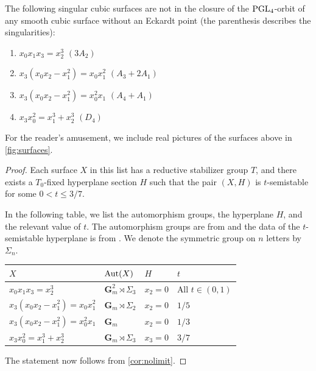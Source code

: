 \documentclass[12pt,reqno]{amsart}
\numberwithin{equation}{section}
\newcommand{\G}{\mathbf G}
\begin{document}
\begin{proposition}\label{prop:isogood}
  The following singular cubic surfaces are not in the closure of the $\operatorname{PGL}_4$-orbit of any smooth cubic surface without an Eckardt point (the parenthesis describes the singularities):
  \begin{enumerate}
  \item $x_0x_1x_3 = x_2^3$ \quad $(3A_2)$
  \item $x_3(x_0x_2-x_1^2) = x_0x_1^2$ \quad $(A_3 + 2A_1)$
  \item $x_3(x_0x_2-x_1^2) = x_0^2x_1$ \quad $(A_4 + A_1)$
  \item $x_3x_0^2 = x_1^3 + x_2^3$ \quad $(D_4)$
  \end{enumerate}
\end{proposition}
For the reader's amusement, we include real pictures of the surfaces above in \autoref{fig:surfaces}.
\begin{proof}
  Each surface $X$ in this list has a reductive stabilizer group $T$, and there exists a $T_0$-fixed hyperplane section $H$ such that the pair $(X, H)$ is $t$-semistable for some $0 < t \leq 3/7$.

  In the following table, we list the automorphism groups, the hyperplane $H$, and the relevant value of $t$.
  The automorphism groups are from \cite[Theorem~3]{sak:10} and the data of the $t$-semistable hyperplane is from \cite[Table~2]{gal.mar:19}.
  We denote the symmetric group on $n$ letters by $\Sigma_n$.
  \begin{center}
  \begin{tabular}{l l l l}
    \toprule
    $X$ & $\operatorname{Aut}(X)$ & $H$ & $t$\\
    \midrule
    $x_0x_1x_3 = x_2^3$& $\G_m^2 \rtimes \Sigma_3$ & $x_2 = 0$ & All $t \in (0,1)$\\
    $x_3(x_0x_2-x_1^2) = x_0x_1^2$& $\G_m \rtimes \Sigma_2$ & $x_2 = 0$ & $1/5$ \\
    $x_3(x_0x_2-x_1^2) = x_0^2x_1$& $\G_m$ & $x_2 = 0$ & $1/3$\\
    $x_3x_0^2 = x_1^3 + x_2^3$& $\G_m \rtimes \Sigma_3$ & $x_3 = 0$ & $3/7$\\
    \bottomrule
  \end{tabular}
\end{center}
The statement now follows from  \autoref{cor:nolimit}.
\end{proof}
\end{document}
